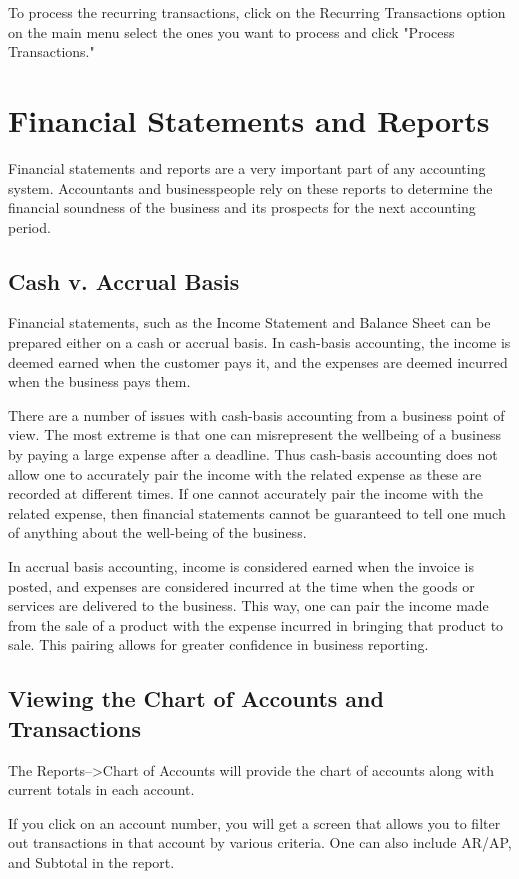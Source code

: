 \documentclass{article}
\begin{document}
To process the recurring transactions, click on the Recurring Transactions
option on the main menu select the ones you want to process and click "Process
Transactions."

\section{Financial Statements and Reports}
Financial statements and reports are a very important part of any accounting
system.  Accountants and businesspeople rely on these reports to determine the
financial soundness of the business and its prospects for the next accounting
period.

\subsection{Cash v. Accrual Basis}
Financial statements, such as the Income Statement and Balance Sheet can be
prepared either on a cash or accrual basis.  In cash-basis accounting, the
income is deemed earned when the customer pays it, and the expenses are deemed
incurred when the business pays them.

There are a number of issues with cash-basis accounting from a business point of
view.  The most extreme is that one can misrepresent the wellbeing of a business
by paying a large expense after a deadline.  Thus cash-basis accounting does not
allow one to accurately pair the income with the related expense as these are
recorded at different times.  If one cannot accurately pair the income with the
related expense, then financial statements cannot be guaranteed to tell one much
of anything about the well-being of the business.

In accrual basis accounting, income is considered earned when the invoice is 
posted,
and expenses are considered incurred at the time when the goods or services are
delivered to the business.  This way, one can pair the income made from the sale
of a product with the expense incurred in bringing that product to sale.  This
pairing allows for greater confidence in business reporting.

\subsection{Viewing the Chart of Accounts and Transactions}
The Reports--\textgreater Chart of Accounts will provide the chart of accounts
along with current totals in each account.

If you click on an account number, you will get a screen that allows you to
filter out transactions in that account by various criteria.  One can also
include AR/AP, and Subtotal in the report.
\end{document}
